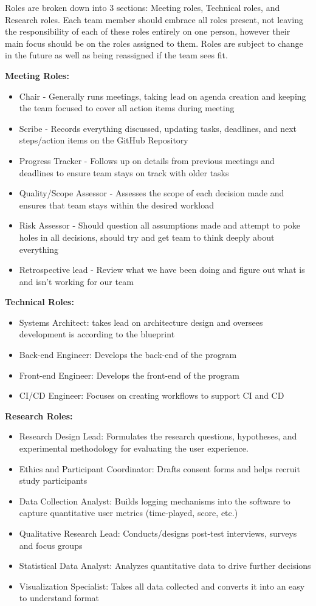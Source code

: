 Roles are broken down into 3 sections: Meeting roles, Technical roles, and Research roles. Each team member should embrace all roles present, not leaving the responsibility of each of these roles entirely on one person, however their main focus should be on the roles assigned to them. Roles are subject to change in the future as well as being reassigned if the team sees fit.
\newline

\textbf{Meeting Roles:}
\begin{itemize}
\item Chair - Generally runs meetings, taking lead on agenda creation and keeping the team focused to cover all action items during meeting
\item Scribe - Records everything discussed, updating tasks, deadlines, and next steps/action items on the GitHub Repository
\item Progress Tracker - Follows up on details from previous meetings and deadlines to ensure team stays on track with older tasks
\item Quality/Scope Assessor - Assesses the scope of each decision made and ensures that team stays within the desired workload
\item Risk Assessor - Should question all assumptions made and attempt to poke holes in all decisions, should try and get team to think deeply about everything
\item Retrospective lead - Review what we have been doing and figure out what is and isn’t working for our team
\end{itemize}

\textbf{Technical Roles:}
\begin{itemize}
\item Systems Architect: takes lead on architecture design and oversees development is according to the blueprint
\item Back-end Engineer: Develops the back-end of the program
\item Front-end Engineer: Develops the front-end of the program
\item CI/CD Engineer: Focuses on creating workflows to support CI and CD
\end{itemize}

\textbf{Research Roles:}
\begin{itemize}
\item Research Design Lead: Formulates the research questions, hypotheses, and experimental methodology for evaluating the user experience.
\item Ethics and Participant Coordinator: Drafts consent forms and helps recruit study participants
\item Data Collection Analyst: Builds logging mechanisms into the software to capture quantitative user metrics (time-played, score, etc.)
\item Qualitative Research Lead: Conducts/designs post-test interviews, surveys and focus groups
\item Statistical Data Analyst: Analyzes quantitative data to drive further decisions
\item Visualization Specialist: Takes all data collected and converts it into an easy to understand format
\end{itemize}
